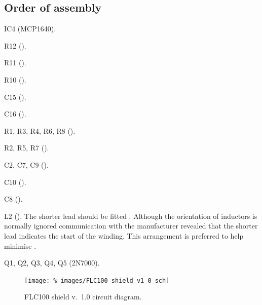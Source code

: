 \subsection{Order of assembly}
\begin{buildorder}
\item IC4 (MCP1640).
\item R12 ().
\item R11 ().
\item R10 ().
\item C15 ().
\item C16 ().
\item R1, R3, R4, R6, R8 ().
\item R2, R5, R7 ().
\item C2, C7, C9 (). 
\item C10 ().
\item C8 ().
\item L2 (). The shorter lead should be fitted
  \todo[\ldots]. Although the orientation of inductors is normally
  ignored communication with the manufacturer revealed that the
  shorter lead indicates the start of the winding. This arrangement is
  preferred to help minimise \rfi.
\item
\item
\item
\item
\item
\item Q1, Q2, Q3, Q4, Q5 (2N7000).
\end{buildorder}

\begin{landscape}
  \begin{figure}[p]
    \centering
    \texttt{[image: \%
      images/FLC100\_shield\_v1\_0\_sch]}
    \caption{FLC100 shield v.~1.0 circuit diagram.}
    \label{fig:flc100-shield-v1.0-cct-diag}
  \end{figure}
\end{landscape}

